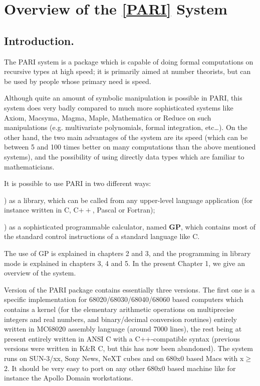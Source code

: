 \chapter{Overview of the {\bf \ref{PARI}} System}

\section{Introduction.}

The PARI system is a package which is capable of doing formal computations
on recursive types at high speed; it is primarily aimed at number
theorists, but can be used by people whose primary need is speed.

Although quite an amount of symbolic manipulation is possible in PARI, this
system does very badly compared to much more sophisticated systems like
Axiom, Macsyma, Magma, Maple, Mathematica or Reduce on such
manipulations (e.g. multivariate
polynomials, formal integration, etc\dots). On the other hand, the two
main advantages of the system are its speed (which can be between 5 and
100 times better on many computations than the above mentioned systems),
and the possibility of using directly data types which are familiar
to mathematicians.

It is possible to use PARI in two different ways:

) as a library, which can be called from any upper-level language
application (for instance written in C, C$++$, Pascal or Fortran);

) as a sophisticated programmable calculator, named {\bf GP}, which
contains most of the standard control instructions of a standard language
like C.

The use of GP is explained in chapters 2 and 3, and the programming in library
mode is explained in chapters 3, 4 and 5. In the present Chapter 1, we give
an overview of the system.


Version \vers{} of the PARI package contains essentially three versions. The 
first one is a specific implementation for 68020/68030/68040/68060 based
computers which contains a kernel (for
the elementary arithmetic operations on multiprecise integers and real numbers,
and binary/decimal conversion routines) entirely  written in MC68020 assembly
language (around 7000 lines), the rest being at present entirely written in 
ANSI C with a C++-compatible syntax (previous versions were written in K\&R C,
but this has now been abandoned).
The system runs on SUN-3/xx, Sony News, NeXT cubes and on 680x0 based
Macs with x$\ge$2. It should be very easy to port on any other 680x0 based
machine like for instance the Apollo Domain workstations.


